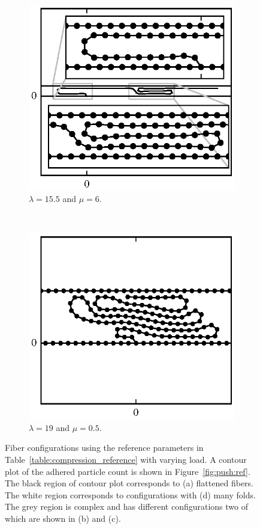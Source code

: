 \begin{figure}[h!]
		\begin{subfigure}{.5\textwidth}
			\centering
			\includegraphics{./fig/ch3/push/ref/l15.5_m6.eps}
			\caption{$\lambda=15.5$ and $\mu=6$.\label{subfig:lonely_pancake}}
		\end{subfigure}%
		~
		\begin{subfigure}{.5\textwidth}
			\centering
			\includegraphics{./fig/ch3/push/ref/l19_m0.5.eps}
			\caption{$\lambda=19$ and $\mu=0.5$.\label{subfig:crushed}}
		\end{subfigure}
		\caption{Fiber configurations using the reference parameters in Table~\ref{table:compression_reference} with varying load. A contour plot of the adhered particle count is shown in Figure~\ref{fig:push:ref}. The black region of contour plot corresponds to (a) flattened fibers. The white region corresponds to configurations with (d) many folds. The grey region is complex and has different configurations two of which are shown in (b) and (c).\label{fig:ref_normal}}
	\end{figure}

